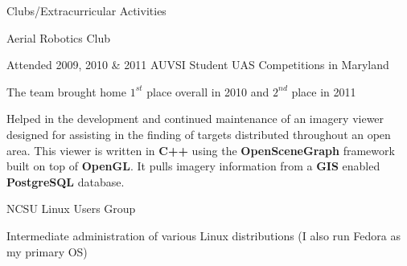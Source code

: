 \documentclass[11pt]{article}
\begin{document}
        \begin{itemz}
            \setlength{\itemsep}{0pt}
            \setlength{\parskip}{0pt}
            \setlength{\parsep}{0pt}
            \item Clubs/Extracurricular Activities
                \begin{itemz}[-]
                    \item Aerial Robotics Club
                        \begin{itemz}[*]
                            \item Attended 2009, 2010 \& 2011 AUVSI Student UAS Competitions in Maryland
                            \item The team brought home $1^{st}$ place overall in 2010 and $2^{nd}$ place in 2011
                            \item Helped in the development and continued maintenance of an imagery viewer designed for assisting in the finding of targets distributed throughout an open area.  This viewer is written in {\bf C++} using the {\bf OpenSceneGraph} framework built on top of {\bf OpenGL}.  It pulls imagery information from a {\bf GIS} enabled {\bf PostgreSQL} database.
                        \end{itemz}
                    \item NCSU Linux Users Group
                \end{itemz}
            \item Intermediate administration of various Linux distributions (I also run Fedora as my primary OS)
        \end{itemz}
\end{document}
